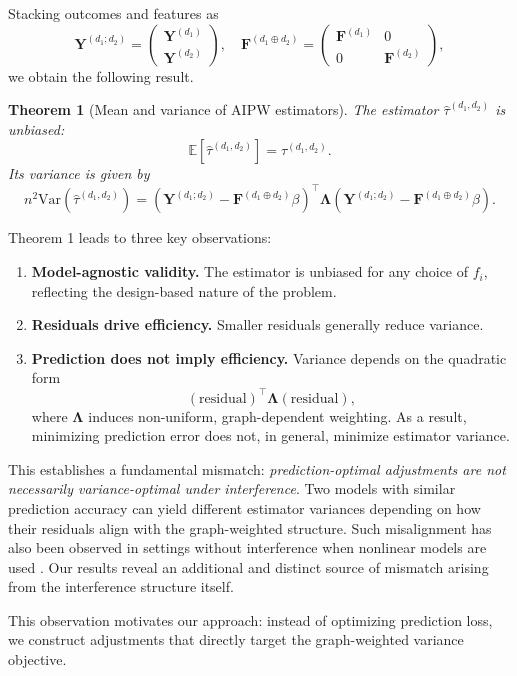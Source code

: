 \documentclass{article}
\theoremstyle{plain}
\newtheorem{theorem}{Theorem}[section]
\theoremstyle{definition}
\theoremstyle{remark}
\newcommand{\E}{\mathbb{E}}
\newcommand{\Var}{\mathrm{Var}}
\newcommand{\bY}{\boldsymbol{Y}}
\newcommand{\bF}{\boldsymbol{F}}
\newcommand{\bLambda}{\boldsymbol{\Lambda}}
\newcommand{\bFaug}{\bF^{(d_1\oplus d_2)}}
\begin{document}
Stacking outcomes and features as
\[
\bY^{(d_1;d_2)} = 
\begin{pmatrix}
\bY^{(d_1)} \\
\bY^{(d_2)}
\end{pmatrix}, \quad
\bFaug =
\begin{pmatrix}
\bF^{(d_1)} & 0 \\
0 & \bF^{(d_2)}
\end{pmatrix},
\]
we obtain the following result.

\begin{theorem}[Mean and variance of AIPW estimators]
The estimator $\hat\tau^{(d_1,d_2)}$ is unbiased:
\[
\E[\hat\tau^{(d_1,d_2)}] = \tau^{(d_1,d_2)}.
\]
Its variance is given by
\[
n^2 \Var(\hat\tau^{(d_1,d_2)}) =
(\bY^{(d_1;d_2)} - \bFaug \beta)^\top
\bLambda
(\bY^{(d_1;d_2)} - \bFaug \beta).
\]
\end{theorem}

Theorem 1 leads to three key observations:

\begin{enumerate}[label=(\roman*)]
\item \textbf{Model-agnostic validity.} The estimator is unbiased for any choice of $f_i$, reflecting the design-based nature of the problem.

\item \textbf{Residuals drive efficiency.} Smaller residuals generally reduce variance.

\item \textbf{Prediction does not imply efficiency.} Variance depends on the quadratic form
\[
(\text{residual})^\top \bLambda (\text{residual}),
\]
where $\bLambda$ induces non-uniform, graph-dependent weighting. As a result, minimizing prediction error does not, in general, minimize estimator variance.
\end{enumerate}

This establishes a fundamental mismatch: \emph{prediction-optimal adjustments are not necessarily variance-optimal under interference}. Two models with similar prediction accuracy can yield  different estimator variances depending on how their residuals align with the graph-weighted structure. Such misalignment has also been observed in settings without interference when nonlinear models are used \citep{fogarty2018regression, guo2023generalized}. Our results reveal an additional and distinct source of mismatch arising from the interference structure itself.

This observation motivates our approach: instead of optimizing prediction loss, we construct adjustments that directly target the graph-weighted variance objective.
\end{document}
